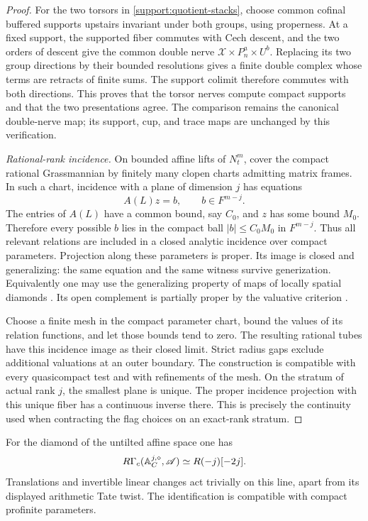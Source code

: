 \begin{proof}
For the two torsors in \eqref{support:quotient-stacks}, choose
common cofinal buffered supports upstairs invariant under both groups,
using properness.  At a fixed support, the supported fiber commutes with Cech
descent, and the two orders of descent give the common double nerve
$\mathcal X\times P_n^a\times U^b$.  Replacing its two group directions
by their bounded resolutions gives a finite double complex whose terms
are retracts of finite sums.  The support colimit therefore commutes with
both directions.  This proves that the torsor nerves compute compact
supports and that the two presentations agree.  The comparison remains
the canonical double-nerve map; its support, cup, and trace maps are
unchanged by this verification.

\emph{Rational-rank incidence.}
On bounded
affine lifts of $N_t^m$, cover the compact rational Grassmannian
by finitely many clopen charts admitting matrix frames.  In such a
chart, incidence with a plane of dimension $j$ has equations
\[
 A(L)z=b,\qquad b\in F^{m-j}.
\]
The entries of $A(L)$ have a common bound, say $C_0$, and $z$ has
some bound $M_0$.  Therefore every possible $b$ lies in the compact
ball $|b|\leq C_0M_0$ in $F^{m-j}$.  Thus all relevant relations
are included in a closed analytic incidence over compact
parameters.  Projection along these parameters is proper.  Its
image is closed and generalizing: the same equation and the same
witness survive generization.  Equivalently one may use the
generalizing property of maps of locally spatial diamonds
\cite[Proposition~11.19(iv), Definition~18.1, and Remark~18.2]{ScholzeDiamonds}.
Its open complement is partially proper by the valuative
criterion \cite[Definition~18.4]{ScholzeDiamonds}.

Choose a finite mesh in the compact parameter chart, bound the
values of its relation functions, and let those bounds tend to
zero.  The resulting rational tubes have this incidence image as
their closed limit.  Strict radius gaps exclude additional
valuations at an outer boundary.  The construction is compatible
with every quasicompact test and with refinements of the mesh.
On the stratum of actual rank $j$, the smallest plane is unique.
The proper incidence projection with this unique fiber has a
continuous inverse there.  This is precisely the continuity used
when contracting the flag choices on an exact-rank stratum.
\end{proof}

\begin{lemma}\label{support:affine}
For the diamond of the untilted affine space one has
\[
 R\Gamma_c(\mathbb A_C^{j,\diamond},\mathscr A)
 \simeq R(-j)[-2j].
\]
Translations and invertible linear changes act trivially on this
line, apart from its displayed arithmetic Tate twist.  The
identification is compatible with compact profinite parameters.
\end{lemma}

